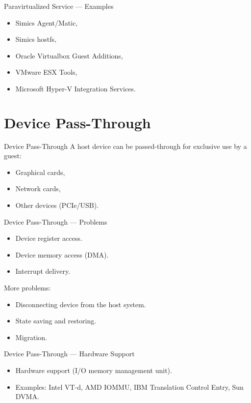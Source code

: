 \begin{frame}{Paravirtualized Service --- Examples}
  \begin{itemize}
    \item Simics Agent/Matic,
    \item Simics hostfs,
    \item Oracle Virtualbox Guest Additions,
    \item VMware ESX Tools,
    \item Microsoft Hyper-V Integration Services.
  \end{itemize}
\end{frame}

\section{Device Pass-Through}

\begin{frame}{Device Pass-Through}
  A host device can be passed-through for exclusive use by a guest:
  \begin{itemize}
    \item Graphical cards,
    \item Network cards,
    \item Other devices (PCIe/USB).
  \end{itemize}
\end{frame}

\begin{frame}{Device Pass-Through --- Problems}
  \begin{itemize}
    \item Device register access.
    \item Device memory access (DMA).
    \item Interrupt delivery.
  \end{itemize}
  \pause
  \vfill
  More problems:
  \begin{itemize}
    \item Disconnecting device from the host system.
    \item State saving and restoring.
    \item Migration.
  \end{itemize}
\end{frame}

\begin{frame}{Device Pass-Through --- Hardware Support}
  \begin{itemize}
    \item Hardware support (I/O memory management unit).
    \item Examples: Intel VT-d, AMD IOMMU, IBM Translation Control Entry,
      Sun DVMA.
  \end{itemize}
\end{frame}

